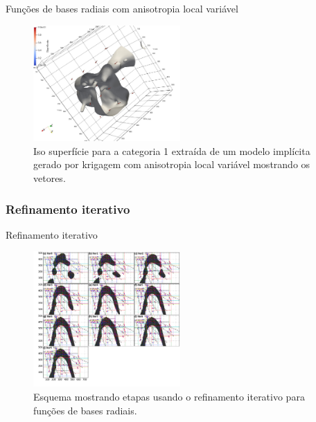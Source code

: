 \documentclass[aspectratio=169]{beamer}
\begin{document}
\begin{frame}{Funções de bases radiais com anisotropia local variável}
	\begin{figure}[H]
		\caption{\label{rbf_iterref}Iso superfície para a categoria 1 extraída de um modelo implícita gerado por krigagem com anisotropia local variável mostrando os vetores.}
		\begin{center}
			\includegraphics[width=0.5\textwidth]{capitulo_2/rbf_iterref.jpeg}
		\end{center}
	\end{figure}
\end{frame}

\subsubsection{Refinamento iterativo}

\begin{frame}{Refinamento iterativo}
	\begin{figure}[H]
		\caption{\label{iterref} Esquema mostrando etapas usando o refinamento iterativo para funções de bases radiais.}
		\begin{center}
			\includegraphics[width=0.5\textwidth]{capitulo_2/iterref.jpg}
		\end{center}
	\end{figure}
\end{frame}
\end{document}
